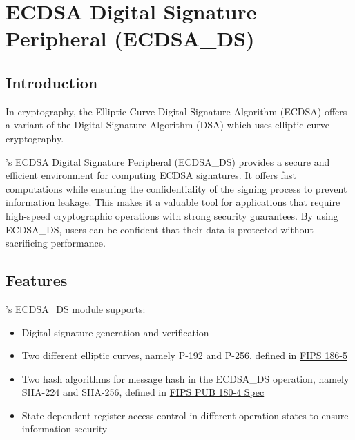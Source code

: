 \documentclass[main\_\_EN.tex]{subfiles}
\begin{document}

\ifglobal
\else

    \listoftodos
    {\let\clearpage\relax \listofdonetodos}
    \tableofcontents
\fi



\hypertarget{ecdsa}{}
\chapter{ECDSA Digital Signature Peripheral (ECDSA\_DS)}
\label{mod:ecdsa}


\section{Introduction}

In cryptography, the Elliptic Curve Digital Signature Algorithm (ECDSA) offers a variant of the Digital Signature Algorithm (DSA) which uses elliptic-curve cryptography.

\chipname{}'s ECDSA Digital Signature Peripheral (ECDSA\_DS) provides a secure and efficient environment for computing ECDSA signatures. It offers fast computations while ensuring the confidentiality of the signing process to prevent information leakage. This makes it a valuable tool for applications that require high-speed cryptographic operations with strong security guarantees. By using ECDSA\_DS, users can be confident that their data is protected without sacrificing performance.



\section{Features}
\label{sec:ecdsa-features}

\chipname{}'s ECDSA\_DS module supports:

\begin{itemize}
    \item Digital signature generation and verification
    \item Two different elliptic curves, namely P-192 and P-256, defined in \href{https://nvlpubs.nist.gov/nistpubs/FIPS/NIST.FIPS.186-5.pdf}{FIPS 186-5}
    \item Two hash algorithms for message hash in the ECDSA\_DS operation, namely SHA-224 and SHA-256, defined in \href{https://doi.org/10.6028/NIST.FIPS.180-4}{FIPS PUB 180-4 Spec}
    \item State-dependent register access control in different operation states to ensure information security
\end{itemize}
\end{document}
